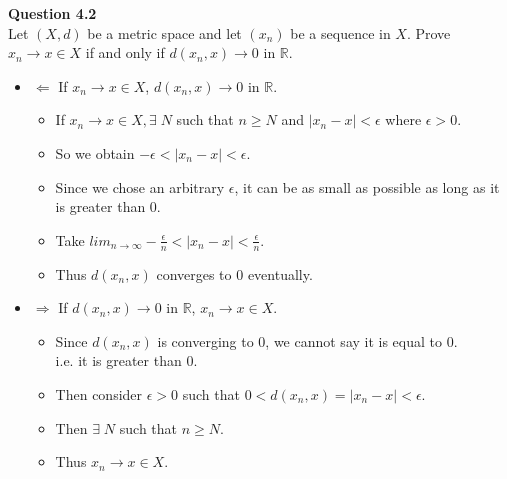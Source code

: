 \documentclass[12pt]{article}
\begin{document}
\textbf{Question 4.2}\\
Let $(X,d)$ be a metric space and let $(x_n)$ be a sequence in $X$. Prove $x_n \rightarrow x\in X$ if and only if $d(x_n,x) \rightarrow 0$ in $\mathbb{R}$.


\begin{itemize}
    \item $\Leftarrow$ If $x_n \rightarrow x\in X$, $d(x_n,x) \rightarrow 0$ in $\mathbb{R}$.
    \begin{itemize}
        \item If $x_n \rightarrow x\in X, \exists\; N$ such that $n\ge N$ and $|x_n - x| < \epsilon$ where $\epsilon > 0$.
        
        \item So we obtain $-\epsilon < |x_n - x| < \epsilon$. 
        
        \item Since we chose an arbitrary $\epsilon$, it can be as small as possible as long as it is greater than 0. 
        
        \item Take $lim_{n\rightarrow \infty} -\frac{\epsilon}{n} < |x_n - x| < \frac{\epsilon}{n}$.
        
        \item Thus $d(x_n, x)$ converges to 0 eventually.
    \end{itemize}
    
    \item $\Rightarrow$ If $d(x_n,x) \rightarrow 0$ in $\mathbb{R}$, $x_n \rightarrow x\in X$.
    \begin{itemize}
        \item Since $d(x_n,x)$ is converging to 0, we cannot say it is equal to 0.\\ 
        i.e. it is greater than 0.  
        
        \item Then consider $\epsilon > 0$ such that $0 < d(x_n, x) = |x_n - x| < \epsilon$.

        \item Then $\exists\; N$ such that $n\ge N$.
        
        \item Thus $x_n \rightarrow x \in X$.
    \end{itemize}
\end{itemize}
\end{document}
